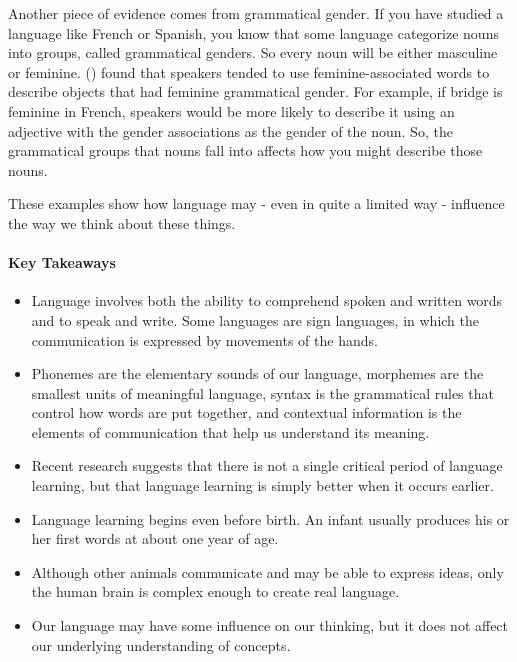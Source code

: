 \documentclass[
]{krantz}
\providecommand{\tightlist}{%
  \setlength{\itemsep}{0pt}\setlength{\parskip}{0pt}}
\begin{document}
Another piece of evidence comes from grammatical gender. If you have studied a language like French or Spanish, you know that some language categorize nouns into groups, called grammatical genders. So every noun will be either masculine or feminine. () found that speakers tended to use feminine-associated words to describe objects that had feminine grammatical gender. For example, if bridge is feminine in French, speakers would be more likely to describe it using an adjective with the gender associations as the gender of the noun. So, the grammatical groups that nouns fall into affects how you might describe those nouns.

These examples show how language may - even in quite a limited way - influence the way we think about these things.

\paragraph*{Key Takeaways}\label{key-takeaways-7}

\begin{itemize}
\tightlist
\item
  Language involves both the ability to comprehend spoken and written words and to speak and write. Some languages are sign languages, in which the communication is expressed by movements of the hands.
\item
  Phonemes are the elementary sounds of our language, morphemes are the smallest units of meaningful language, syntax is the grammatical rules that control how words are put together, and contextual information is the elements of communication that help us understand its meaning.
\item
  Recent research suggests that there is not a single critical period of language learning, but that language learning is simply better when it occurs earlier.
\item
  Language learning begins even before birth. An infant usually produces his or her first words at about one year of age.
\item
  Although other animals communicate and may be able to express ideas, only the human brain is complex enough to create real language.
\item
  Our language may have some influence on our thinking, but it does not affect our underlying understanding of concepts.
\end{itemize}
\end{document}
